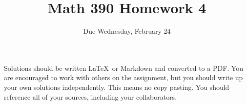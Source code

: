 \documentclass{article}
\title{Math 390 Homework 4}
\author{Due Wednesday, February 24}
\date{}
\begin{document}

\maketitle

\setlength{\parindent}{0em} %
\setlength{\parskip}{1em} %



Solutions should be written \LaTeX\ or Markdown and converted to a PDF. You are encouraged to work with others
on the assignment, but you should write up your own solutions independently. This means no copy pasting. You should
reference all of your sources, including your collaborators. 
\end{document}
